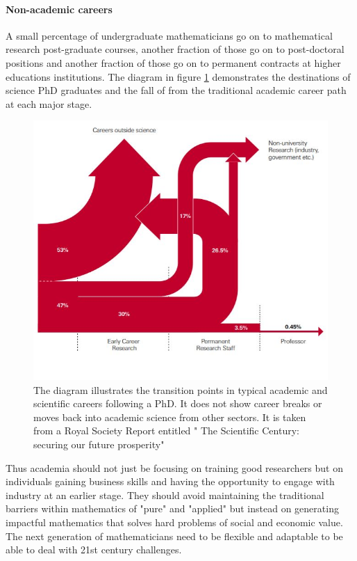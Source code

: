 \documentclass[11pt]{article} %
\begin{document}
\paragraph{Non-academic careers}

A small percentage of undergraduate mathematicians go on to mathematical research post-graduate courses, another fraction of those go on to post-doctoral positions and another fraction of those go on to permanent contracts at higher educations institutions. The diagram in figure \ref{fig:phd-career-paths} demonstrates the destinations of science PhD graduates and the fall of from the traditional academic career path at each major stage. 

\begin{figure}
	\centering
	\includegraphics[width=0.9\linewidth]{"Report_images/phd career paths"}
	\caption{The diagram illustrates the transition points in typical academic and scientific careers following a PhD. It does not show career breaks or moves back into academic science from other sectors. It is taken from a Royal Society Report entitled " The Scientific Century: securing our future prosperity" \cite{royalsoc2010}}
	\label{fig:phd-career-paths}
\end{figure}

Thus academia should not just be focusing on training good researchers but on individuals gaining business skills and having the opportunity to engage with industry at an earlier stage. They should avoid maintaining the traditional barriers within mathematics of "pure" and "applied" but instead on  generating impactful mathematics that solves hard problems of social and economic value. The next generation of mathematicians need to be flexible and adaptable to be  able to deal with 21st century challenges.
\end{document}
